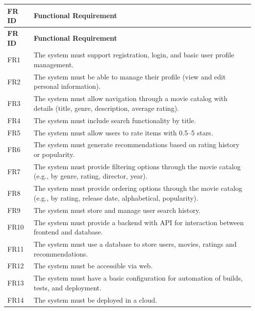 \documentclass{article}
\begin{document}
\renewcommand{\arraystretch}{1.2}
\setlength{\tabcolsep}{6pt}

\begin{longtable}{|p{2cm}|p{13cm}|}
\hline
\textbf{FR ID} & \textbf{Functional Requirement} \\ \hline
\endfirsthead
\hline
\textbf{FR ID} & \textbf{Functional Requirement} \\ \hline
\endhead

FR1 & The system must support registration, login, and basic user profile management. \\ \hline
FR2 & The system must be able to manage their profile (view and edit personal information). \\ \hline
FR3 & The system must allow navigation through a movie catalog with details (title, genre, description, average rating). \\ \hline
FR4 & The system must include search functionality by title. \\ \hline
FR5 & The system must allow users to rate items with 0.5--5 stars. \\ \hline
FR6 & The system must generate recommendations based on rating history or popularity. \\ \hline
FR7 & The system must provide filtering options through the movie catalog (e.g., by genre, rating, director, year). \\ \hline
FR8 & The system must provide ordering options through the movie catalog (e.g., by rating, release date, alphabetical, popularity). \\ \hline
FR9 & The system must store and manage user search history. \\ \hline
FR10 & The system must provide a backend with API for interaction between frontend and database. \\ \hline
FR11 & The system must use a database to store users, movies, ratings and recommendations. \\ \hline
FR12 & The system must be accessible via web. \\ \hline
FR13 & The system must have a basic configuration for automation of builds, tests, and deployment. \\ \hline
FR14 & The system must be deployed in a cloud. \\ \hline

\end{longtable}
\end{document}
